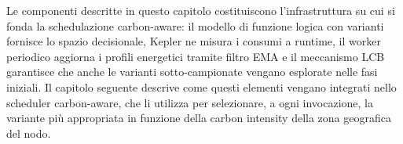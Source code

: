  
\vspace{1em}

Le componenti descritte in questo capitolo costituiscono l'infrastruttura
su cui si fonda la schedulazione carbon-aware: il modello di funzione
logica con varianti fornisce lo spazio decisionale, Kepler ne misura i
consumi a runtime, il worker periodico aggiorna i profili energetici
tramite filtro EMA e il meccanismo LCB garantisce che anche le varianti
sotto-campionate vengano esplorate nelle fasi iniziali. Il capitolo
seguente descrive come questi elementi vengano integrati nello scheduler
carbon-aware, che li utilizza per selezionare, a ogni invocazione, la
variante più appropriata in funzione della carbon intensity della zona
geografica del nodo.